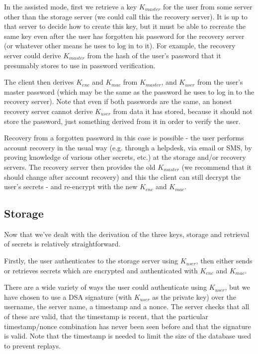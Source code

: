 \documentclass[a4paper,titlepage]{article}
\begin{document}
In the assisted mode, first we retrieve a key $K_{master}$ for the
user from some server other than the storage server (we could call
this the recovery server). It is up to that server to decide how to
create this key, but it must be able to recreate the same key even
after the user has forgotten his password for the recovery server (or
whatever other means he uses to log in to it). For example, the
recovery server could derive $K_{master}$ from the hash of the user's
password that it presumably stores to use in password verification.

The client then derives $K_{enc}$ and $K_{mac}$ from $K_{master}$, and
$K_{user}$ from the user's master password (which may be the same as
the password he uses to log in to the recovery server). Note that even
if both passwords are the same, an honest recovery server cannot
derive $K_{user}$ from data it has stored, because it should not store
the password, just something derived from it in order to verify the
user.

Recovery from a forgotten password in this case is possible - the user
performs account recovery in the usual way (e.g. through a helpdesk,
via email or SMS, by proving knowledge of various other secrets, etc.)
at the storage and/or recovery servers. The recovery server then
provides the old $K_{master}$ (we recommend that it should change
after account recovery) and this the client can still decrypt the
user's secrets - and re-encrypt with the new $K_{enc}$ and $K_{mac}$.

\subsection{Storage}

Now that we've dealt with the derivation of the three keys, storage
and retrieval of secrets is relatively straightforward.

Firstly, the user authenticates to the storage server using
$K_{user}$, then either sends or retrieves secrets which are encrypted
and authenticated with $K_{enc}$ and $K_{mac}$.

There are a wide variety of ways the user could authenticate using
$K_{user}$, but we have chosen to use a DSA signature (with $K_{user}$
as the private key) over the username, the server name, a timestamp
and a nonce. The server checks that all of these are valid, that the
timestamp is recent, that the particular timestamp/nonce combination
has never been seen before and that the signature is valid. Note that
the timestamp is needed to limit the size of the database used to
prevent replays.
\end{document}
